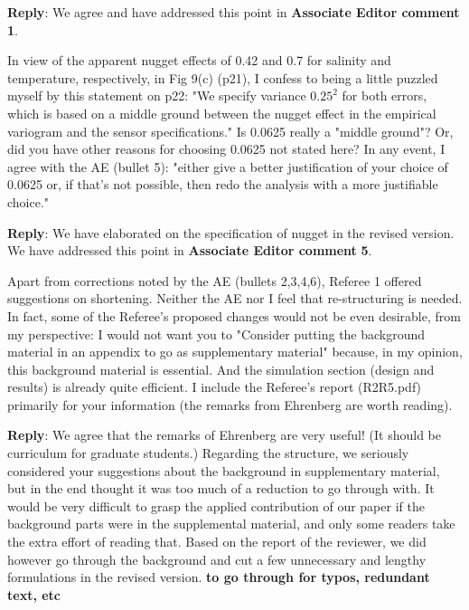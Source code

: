 \documentclass[a4paper]{article}
\newcounter{reviewer}
\def\aecom{\textbf{Associate Editor comment }}
\def\reply{\textbf{Reply}}
\begin{document}
\reply: We agree and have addressed this point in \aecom \textbf{1}. 
 
\vspace{5mm}
 In view of the apparent nugget effects of 0.42 and 0.7 for salinity
and temperature, respectively, in Fig 9(c) (p21), I confess to being
a little puzzled myself by this statement on p22:
"We specify variance $0.25^2$ for both errors, which is based on a
middle ground between the nugget effect in the empirical variogram
and the sensor specifications."  Is 0.0625 really a "middle ground"?
Or, did you have other reasons for choosing 0.0625 not stated here?
In any event, I agree with the AE (bullet 5): "either give a better
justification of your choice of 0.0625 or, if that’s not possible,
then redo the analysis with a more justifiable choice."

\vspace{5mm}
\reply: We have elaborated on the specification of nugget in the revised version. We have addressed this point in \aecom \textbf{5}. 

\vspace{5mm}
 Apart from corrections noted by the AE (bullets 2,3,4,6), Referee 1
offered suggestions on shortening. Neither the AE nor I feel that re-structuring is needed.  In fact, some of the Referee's proposed changes would not be even desirable, from my perspective: I would not want you to "Consider putting the background material in an appendix to go as supplementary material" because, in my opinion, this background material is essential. And the simulation section (design and results) is already quite efficient. I include the Referee's report (R2R5.pdf) primarily for your information (the remarks from Ehrenberg are worth reading).

\vspace{5mm}
\reply: We agree that the remarks of Ehrenberg are very useful! (It should be curriculum for graduate students.) Regarding the structure, we seriously considered your suggestions about the background in supplementary material, but in the end thought it was too much of a reduction to go through with. It would be very difficult to grasp the applied contribution of our paper if the background parts were in the supplemental material, and only some readers take the extra effort of reading that. Based on the report of the reviewer, we did however go through the background and cut a few unnecessary and lengthy formulations in the revised version. {\bf{to go through for typos, redundant text, etc}}
\end{document}
